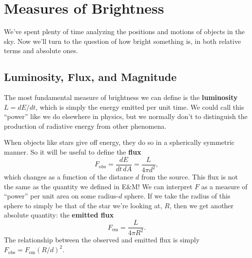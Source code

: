 \documentclass[../a062main.tex]{subfiles}
\begin{document}
\section{Measures of Brightness}
We've spent plenty of time analyzing the positions and motions of objects in the sky.
Now we'll turn to the question of how bright something is, in both relative terms and absolute ones.

\subsection*{Luminosity, Flux, and Magnitude}
The most fundamental measure of brightness we can define is the \textbf{luminosity} $L = dE / dt$, which is simply the energy emitted per unit time.
We could call this ``power'' like we do elsewhere in physics, but we normally don't to distinguish the production of radiative energy from other phenomena.

When objects like stars give off energy, they do so in a spherically symmetric manner.
So it will be useful to define the \textbf{flux}
\[ \boxed{F_\textrm{obs} = \frac{dE}{dt \,dA} = \frac{L}{4 \pi d^2}}, \]
which changes as a function of the distance $d$ from the source.
This flux is not the same as the quantity we defined in E\&M!
We can interpret $F$ as a measure of ``power'' per unit area on some radius-$d$ sphere.
If we take the radius of this sphere to simply be that of the star we're looking at, $R$, then we get another absolute quantity: the \textbf{emitted flux}
\[ F_\textrm{em} = \frac{L}{4 \pi R^2}. \]
The relationship between the observed and emitted flux is simply $F_\textrm{obs} = F_\textrm{em} (R / d)^2$.
\end{document}
